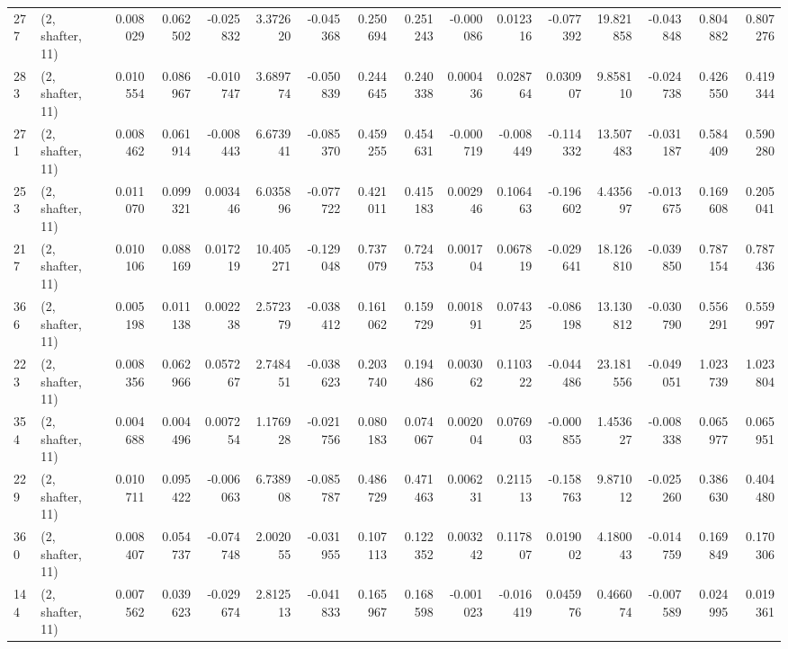 \begin{tabular}{llrrrrrrrrrrrrrr}
277 &  (2, shafter, 11) &   0.008029 &  0.062502 & -0.025832 &    3.372620 & -0.045368 &   0.250694 &  0.251243 & -0.000086 &  0.012316 & -0.077392 &   19.821858 & -0.043848 &  0.804882 &  0.807276 \\
283 &  (2, shafter, 11) &   0.010554 &  0.086967 & -0.010747 &    3.689774 & -0.050839 &   0.244645 &  0.240338 &  0.000436 &  0.028764 &  0.030907 &    9.858110 & -0.024738 &  0.426550 &  0.419344 \\
271 &  (2, shafter, 11) &   0.008462 &  0.061914 & -0.008443 &    6.673941 & -0.085370 &   0.459255 &  0.454631 & -0.000719 & -0.008449 & -0.114332 &   13.507483 & -0.031187 &  0.584409 &  0.590280 \\
253 &  (2, shafter, 11) &   0.011070 &  0.099321 &  0.003446 &    6.035896 & -0.077722 &   0.421011 &  0.415183 &  0.002946 &  0.106463 & -0.196602 &    4.435697 & -0.013675 &  0.169608 &  0.205041 \\
217 &  (2, shafter, 11) &   0.010106 &  0.088169 &  0.017219 &   10.405271 & -0.129048 &   0.737079 &  0.724753 &  0.001704 &  0.067819 & -0.029641 &   18.126810 & -0.039850 &  0.787154 &  0.787436 \\
366 &  (2, shafter, 11) &   0.005198 &  0.011138 &  0.002238 &    2.572379 & -0.038412 &   0.161062 &  0.159729 &  0.001891 &  0.074325 & -0.086198 &   13.130812 & -0.030790 &  0.556291 &  0.559997 \\
223 &  (2, shafter, 11) &   0.008356 &  0.062966 &  0.057267 &    2.748451 & -0.038623 &   0.203740 &  0.194486 &  0.003062 &  0.110322 & -0.044486 &   23.181556 & -0.049051 &  1.023739 &  1.023804 \\
354 &  (2, shafter, 11) &   0.004688 &  0.004496 &  0.007254 &    1.176928 & -0.021756 &   0.080183 &  0.074067 &  0.002004 &  0.076903 & -0.000855 &    1.453627 & -0.008338 &  0.065977 &  0.065951 \\
229 &  (2, shafter, 11) &   0.010711 &  0.095422 & -0.006063 &    6.738908 & -0.085787 &   0.486729 &  0.471463 &  0.006231 &  0.211513 & -0.158763 &    9.871012 & -0.025260 &  0.386630 &  0.404480 \\
360 &  (2, shafter, 11) &   0.008407 &  0.054737 & -0.074748 &    2.002055 & -0.031955 &   0.107113 &  0.122352 &  0.003242 &  0.117807 &  0.019002 &    4.180043 & -0.014759 &  0.169849 &  0.170306 \\
144 &  (2, shafter, 11) &   0.007562 &  0.039623 & -0.029674 &    2.812513 & -0.041833 &   0.165967 &  0.168598 & -0.001023 & -0.016419 &  0.045976 &    0.466074 & -0.007589 &  0.024995 &  0.019361 \\

\end{tabular}
